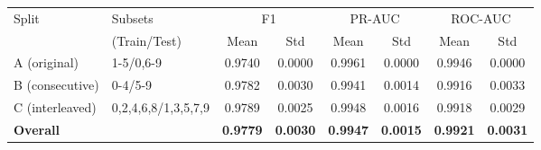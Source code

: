 \begin{tabular}{llcccccc}
\toprule
Split & Subsets & \multicolumn{2}{c}{F1} & \multicolumn{2}{c}{PR-AUC} & \multicolumn{2}{c}{ROC-AUC} \\
\cmidrule(lr){3-4} \cmidrule(lr){5-6} \cmidrule(lr){7-8}
 & (Train/Test) & Mean & Std & Mean & Std & Mean & Std \\
\midrule
A (original) & {1-5}/{0,6-9} & 0.9740 & 0.0000 & 0.9961 & 0.0000 & 0.9946 & 0.0000 \\
B (consecutive) & {0-4}/{5-9} & 0.9782 & 0.0030 & 0.9941 & 0.0014 & 0.9916 & 0.0033 \\
C (interleaved) & {0,2,4,6,8}/{1,3,5,7,9} & 0.9789 & 0.0025 & 0.9948 & 0.0016 & 0.9918 & 0.0029 \\
\midrule
\textbf{Overall} & & \textbf{0.9779} & \textbf{0.0030} & \textbf{0.9947} & \textbf{0.0015} & \textbf{0.9921} & \textbf{0.0031} \\
\bottomrule
\end{tabular}

